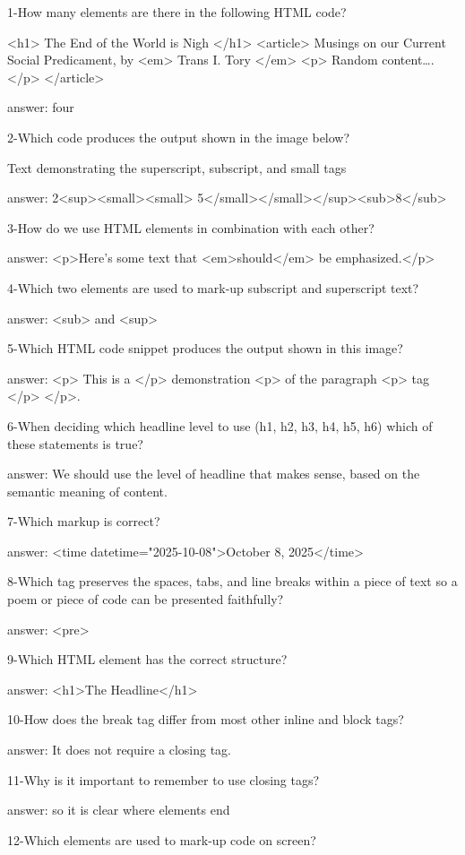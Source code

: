 1-How many elements are there in the following HTML code?

<h1> The End of the World is Nigh </h1>
<article> Musings on our Current Social Predicament, by <em> Trans  I. Tory </em> 
<p> Random content….</p>
</article>

answer: four

2-Which code produces the output shown in the image below? 

Text demonstrating the superscript, subscript, and small tags

answer: 2<sup><small><small> 5</small></small></sup><sub>8</sub>

3-How do we use HTML elements in combination with each other?

answer: <p>Here's some text that <em>should</em> be emphasized.</p>

4-Which two elements are used to mark-up subscript and superscript text?

answer: <sub> and <sup>

5-Which HTML code snippet produces the output shown in this image? 

answer: <p> This is a </p> demonstration <p> of the paragraph <p> tag </p> </p>.

6-When deciding which headline level to use (h1, h2, h3, h4, h5, h6) which of these statements is true?

answer: We should use the level of headline that makes sense, based on the semantic meaning of content.

7-Which markup is correct?

answer: <time datetime="2025-10-08">October 8, 2025</time>

8-Which tag preserves the spaces, tabs, and line breaks within a piece of text so a poem or piece of code can be presented faithfully?

answer: <pre>

9-Which HTML element has the correct structure?

answer: <h1>The Headline</h1>

10-How does the break tag differ from most other inline and block tags?

answer: It does not require a closing tag.

11-Why is it important to remember to use closing tags?

answer: so it is clear where elements end

12-Which elements are used to mark-up code on screen?

